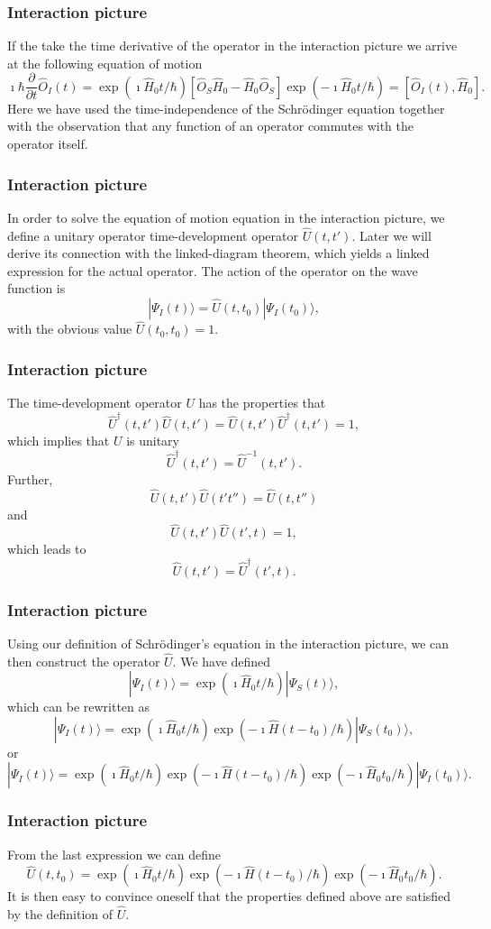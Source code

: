 \frame
{
\frametitle{Interaction picture}
\begin{small}
{\scriptsize
If the take the time derivative of the operator in the interaction picture we arrive at the following equation of motion
\[
\imath \hbar\frac{\partial }{\partial t}\hat{O}_I(t) = \exp{(\imath\hat{H}_0t/\hbar)}\left[\hat{O}_S\hat{H}_0-\hat{H}_0\hat{O}_S\right]\exp{(-\imath\hat{H}_0t/\hbar)}=\left[\hat{O}_I(t),\hat{H}_0\right].
\]
Here we have used the time-independence of the Schr\"odinger equation
together with the observation that any function of an operator commutes with the operator itself. 
}
\end{small}
}
\frame
{
\frametitle{Interaction picture}
\begin{small}
{\scriptsize
In order to solve the equation of motion equation in the interaction picture, we define a unitary operator
time-development operator $\hat{U}(t,t')$. Later we will derive its
connection with the linked-diagram theorem, which yields a
linked expression for the actual operator. 
The action of the operator on the wave function is
\[
|\Psi_I(t) \rangle = \hat{U}(t,t_0)|\Psi_I(t_0)\rangle,
\]
with the obvious value $\hat{U}(t_0,t_0)=1$.
}
\end{small}
}
\frame
{
\frametitle{Interaction picture}
\begin{small}
{\scriptsize
The time-development operator $U$ has the
properties that
\[
     \hat{U}^{\dagger}(t,t')\hat{U}(t,t')=\hat{U}(t,t')\hat{U}^{\dagger}(t,t')=1,
\]
which implies that $U$ is unitary
\[
     \hat{U}^{\dagger}(t,t')=\hat{U}^{-1}(t,t').
\]
Further,
\[
    \hat{U}(t,t')\hat{U}(t't'')=\hat{U}(t,t'')
\]
and
\[
    \hat{U}(t,t')\hat{U}(t',t)=1,
\]
which leads to
\[
    \hat{U}(t,t')=\hat{U}^{\dagger}(t',t).
\]
}
\end{small}
}
\frame
{
\frametitle{Interaction picture}
\begin{small}
{\scriptsize
Using our definition of Schr\"odinger's equation in the interaction picture, we can then construct the operator $\hat{U}$. We have defined
\[
|\Psi_I(t)\rangle = \exp{(\imath\hat{H}_0t/\hbar)}|\Psi_S(t)\rangle,
\]
which can be rewritten as 
\[
|\Psi_I(t)\rangle = \exp{(\imath\hat{H}_0t/\hbar)}\exp{(-\imath\hat{H}(t-t_0)/\hbar)}|\Psi_S(t_0)\rangle,
\]
or
\[
|\Psi_I(t)\rangle = \exp{(\imath\hat{H}_0t/\hbar)}\exp{(-\imath\hat{H}(t-t_0)/\hbar)}\exp{(-\imath\hat{H}_0t_0/\hbar)}|\Psi_I(t_0)\rangle.
\]
}
\end{small}
}
\frame
{
\frametitle{Interaction picture}
\begin{small}
{\scriptsize
From the last expression we can define
\[
\hat{U}(t,t_0)=\exp{(\imath\hat{H}_0t/\hbar)}\exp{(-\imath\hat{H}(t-t_0)/\hbar)}\exp{(-\imath\hat{H}_0t_0/\hbar)}.
\]
It is then easy to convince oneself that the properties defined above are satisfied by the definition of $\hat{U}$. 
}
\end{small}
}
